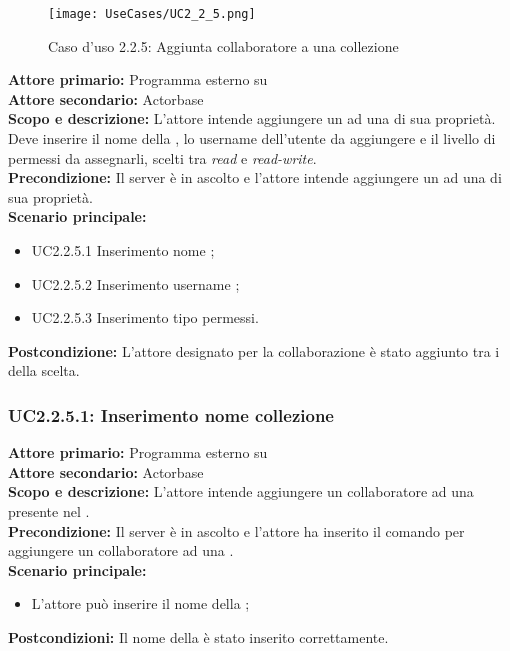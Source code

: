 \documentclass{scalatekids-article}
\begin{document}
\begin{figure}[H]
  \begin{center}
    \texttt{[image: UseCases/UC2\_2\_5.png]}
    \caption{Caso d'uso 2.2.5: Aggiunta collaboratore a una collezione}
  \end{center}
\end{figure}
\textbf{Attore primario:} Programma esterno su \\
\textbf{Attore secondario:} Actorbase\\
\textbf{Scopo e descrizione:} L'attore intende aggiungere un  ad una  di sua proprietà. Deve inserire il nome della , lo username dell'utente da aggiungere e il livello di permessi da assegnarli, scelti tra \textit{read} e \textit{read-write}.\\
\textbf{Precondizione:} Il server è in ascolto e l'attore intende aggiungere un  ad una  di sua proprietà.\\
\textbf{Scenario principale:}
\begin{itemize}
\item UC2.2.5.1 Inserimento nome ;
\item UC2.2.5.2 Inserimento username ;
\item UC2.2.5.3 Inserimento tipo permessi.
\end{itemize}
\textbf{Postcondizione:} L'attore designato per la collaborazione è stato aggiunto tra i  della  scelta.

\subsubsection{UC2.2.5.1: Inserimento nome collezione}

\textbf{Attore primario:} Programma esterno su \\
\textbf{Attore secondario:} Actorbase\\
\textbf{Scopo e descrizione:} L’attore intende aggiungere un collaboratore ad una  presente nel .\\
\textbf{Precondizione:} Il server è in ascolto e l’attore ha inserito il comando per aggiungere un collaboratore ad una .\\
\textbf{Scenario principale:}
\begin{itemize}
\item L'attore può inserire il nome della ;
\end{itemize}
\textbf{Postcondizioni:} Il nome della  è stato inserito correttamente.
\end{document}
